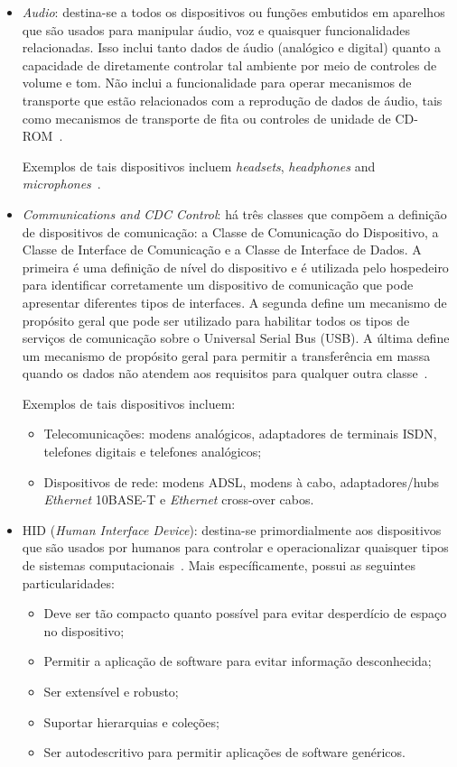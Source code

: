 \begin{itemize}
	\item \emph{Audio}: destina-se a todos os dispositivos ou funções embutidos em aparelhos que são usados para manipular áudio, voz e quaisquer funcionalidades relacionadas. Isso inclui tanto dados de áudio (analógico e digital) quanto a capacidade de diretamente controlar tal ambiente por meio de controles de volume e tom. Não inclui a funcionalidade para operar mecanismos de transporte que estão relacionados com a reprodução de dados de áudio, tais como mecanismos de transporte de fita ou controles de unidade de CD-ROM~\cite{usbaudioclass}.

	Exemplos de tais dispositivos incluem \emph{headsets}, \emph{headphones} and \emph{microphones}~\cite{usbbasicaudioclass}.
	\item \emph{Communications and CDC Control}: há três classes que compõem a definição de dispositivos de comunicação: a Classe de Comunicação do Dispositivo, a Classe de Interface de Comunicação e a Classe de Interface de Dados. A primeira é uma definição de nível do dispositivo e é utilizada pelo hospedeiro para identificar corretamente um dispositivo de comunicação que pode apresentar diferentes tipos de interfaces. A segunda define um mecanismo de propósito geral que pode ser utilizado para habilitar todos os tipos de serviços de comunicação sobre o Universal Serial Bus (USB). A última define um mecanismo de propósito geral para permitir a transferência em massa quando os dados não atendem aos requisitos para qualquer outra classe~\cite{usbcommunicationclass}.

	Exemplos de tais dispositivos incluem:
	\begin{itemize}
		\item Telecomunicações: modens analógicos, adaptadores de terminais ISDN, telefones digitais e telefones analógicos;
		\item Dispositivos de rede: modens ADSL, modens à cabo, adaptadores/hubs \emph{Ethernet} 10BASE-T e \emph{Ethernet} cross-over cabos.
	\end{itemize}
	\item HID (\emph{Human Interface Device}): destina-se primordialmente aos dispositivos que são usados por humanos para controlar e operacionalizar quaisquer tipos de sistemas computacionais~\cite{hid}. Mais específicamente, possui as seguintes particularidades:
	\begin{itemize}
		\item Deve ser tão compacto quanto possível para evitar desperdício de espaço no dispositivo;
		\item Permitir a aplicação de software para evitar informação desconhecida;
		\item Ser extensível e robusto;
		\item Suportar hierarquias e coleções;
		\item Ser autodescritivo para permitir aplicações de software genéricos.
	\end{itemize}


\end{itemize}

